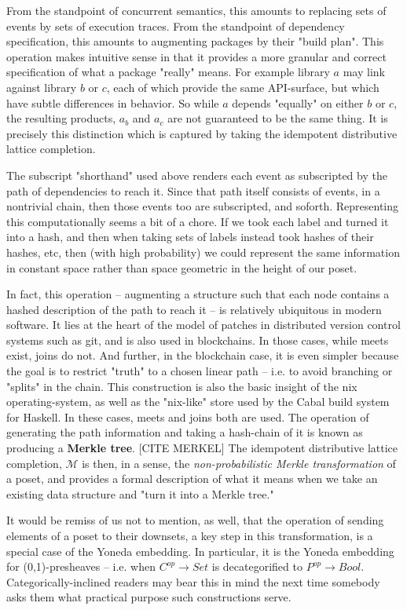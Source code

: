 \documentclass[hoptionsi,review,format=acmsmall]{acmart}
\theoremstyle{definition}
\newcommand{\Mcc}{\mathcal{M}}
\begin{document}
From the standpoint of concurrent semantics, this amounts to replacing sets of events by sets of execution traces. From the standpoint of dependency specification, this amounts to augmenting packages by their "build plan". This operation makes intuitive sense in that it provides a more granular and correct specification of what a package "really" means. For example library \(a\) may link against library \(b\) or \(c\), each of which provide the same API-surface, but which have subtle differences in behavior. So while \(a\) depends "equally" on either \(b\) or \(c\), the resulting products, \(a_b\) and \(a_c\) are not guaranteed to be the same thing. It is precisely this distinction which is captured by taking the idempotent distributive lattice completion.

The subscript "shorthand" used above renders each event as subscripted by the path of dependencies to reach it. Since that path itself consists of events, in a nontrivial chain, then those events too are subscripted, and soforth. Representing this computationally seems a bit of a chore. If we took each label and turned it into a hash, and then when taking sets of labels instead took hashes of their hashes, etc, then (with high probability) we could represent the same information in constant space rather than space geometric in the height of our poset.

In fact, this operation -- augmenting a structure such that each node contains a hashed description of the path to reach it -- is relatively ubiquitous in modern software. It lies at the heart of the model of patches in distributed version control systems such as git, and is also used in blockchains. In those cases, while meets exist, joins do not. And further, in the blockchain case, it is even simpler because the goal is to restrict "truth" to a chosen linear path -- i.e. to avoid branching or "splits" in the chain. This construction is also the basic insight of the nix operating-system, as well as the "nix-like" store used by the Cabal build system for Haskell. In these cases, meets and joins both are used. The operation of generating the path information and taking a hash-chain of it is known as producing a \textbf{Merkle tree}. [CITE MERKEL] The idempotent distributive lattice completion, \(\Mcc\) is then, in a sense, the \textit{non-probabilistic Merkle transformation} of a poset, and provides a formal description of what it means when we take an existing data structure and "turn it into a Merkle tree."

It would be remiss of us not to mention, as well, that the operation of sending elements of a poset to their downsets, a key step in this transformation, is a special case of the Yoneda embedding. In particular, it is the Yoneda embedding for (0,1)-presheaves -- i.e. when \(C^{op} \rightarrow Set\) is decategorified to \(P^{op} \rightarrow Bool\). Categorically-inclined readers may bear this in mind the next time somebody asks them what practical purpose such constructions serve.
\end{document}
